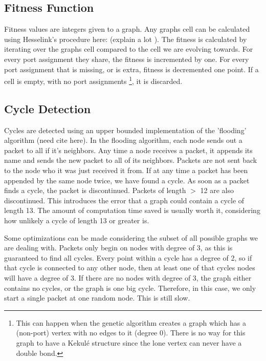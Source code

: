 \documentclass[12pt]{article}
\begin{document}
\subsection{Fitness Function}

Fitness values are integers given to a graph. Any graphs cell can be calculated using Hesselink's procedure here: (explain a lot ). The fitness is calculated by iterating over the graphs cell compared to the cell we are evolving towards. For every port assignment they share, the fitness is incremented by one. For every port assignment that is missing, or is extra, fitness is decremented one point. If a cell is empty, with no port assignments \footnote{This can happen when the genetic algorithm creates a graph which has a (non-port) vertex with no edges to it (degree 0). There is no way for this graph to have a Kekul\'e structure since the lone vertex can never have a double bond.}, it is discarded.

\subsection{Cycle Detection}

Cycles are detected using an upper bounded implementation of the 'flooding' algorithm (need cite here). In the flooding algorithm, each node sends out a packet to all if it's neighbors. Any time a node receives a packet, it appends its name and sends the new packet to all of its neighbors. Packets are not sent back to the node who it was just received it from. If at any time a packet has been appended by the same node twice, we have found a cycle. As soon as a packet finds a cycle, the packet is discontinued. Packets of length $>$ 12 are also discontinued. This introduces the error that a graph could contain a cycle of length 13. The amount of computation time saved is usually worth it, considering how unlikely a cycle of length 13 or greater is. 

Some optimizations can be made considering the subset of all possible graphs we are dealing with. Packets only begin on nodes with degree of 3, as this is guaranteed to find all cycles. Every point within a cycle has a degree of 2, so if that cycle is connected to any other node, then at least one of that cycles nodes will have a degree of 3. If there are no nodes with degree of 3, the graph either contains no cycles, or the graph is one big cycle. Therefore, in this case, we only start a single packet at one random node. This is still slow.
\end{document}
